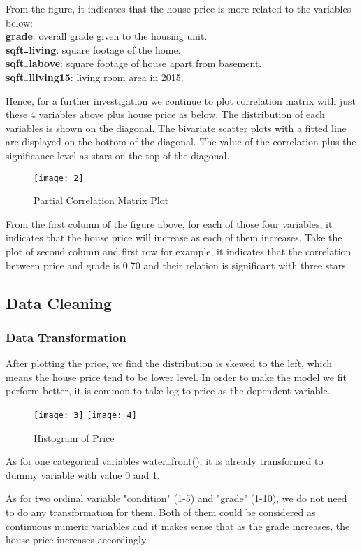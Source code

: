 \documentclass[12pt,twocolumn,twoside]{article}
\begin{document}
From the figure, it indicates that the house price is more related to the variables below:\\
\textbf{grade}: overall grade given to the housing unit.\\
\textbf{sqft$\rule{0.15cm}{0.3mm}$living}:  square footage of the home.\\
\textbf{sqft$\rule{0.15cm}{0.3mm}$labove}: square footage of house apart from basement.\\
\textbf{sqft$\rule{0.15cm}{0.3mm}$lliving15}: living room area in 2015.

Hence, for a further investigation we continue to plot correlation matrix with just these 4 variables above plus house price as below. The distribution of each variables is shown on the diagonal. The bivariate scatter plots with a fitted line are displayed on the bottom of the diagonal. The value of the correlation plus the significance level as stars on the top of the diagonal.
\begin{figure}[h]
\texttt{[image: 2]}
\caption{Partial Correlation Matrix Plot}
\end{figure}
From the first column of the figure above, for each of those four variables, it indicates that the house price will increase as each of them increases. Take the plot of second column and first row for example, it indicates that the correlation between price and grade is 0.70 and their relation is significant with three stars.
\subsection{Data Cleaning}
\subsubsection{Data Transformation}

After plotting the price, we find the distribution is skewed to the left, which means the house price tend to be lower level. In order to make the model we fit perform better, it is common to take log to price as the dependent variable.
\begin{figure}[h]
\texttt{[image: 3]}
\texttt{[image: 4]}
\caption{Histogram of Price}
\end{figure}
As for one categorical variables water$\rule{0.15cm}{0.1mm}$front(), it is already transformed to dummy variable with value 0 and 1.

As for two ordinal variable "condition" (1-5) and "grade" (1-10), we do not need to do any transformation for them. Both of them could be considered as continuous numeric variables and it makes sense that as the grade increases, the house price increases accordingly.
\end{document}
